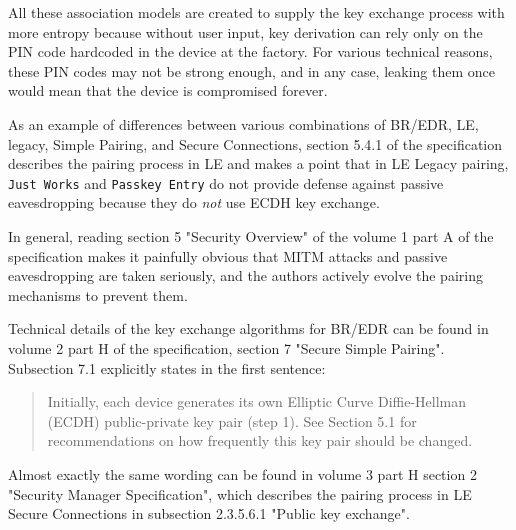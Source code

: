 All these association models are created to supply the key exchange process with more entropy because without user input, key derivation can rely only on the PIN code hardcoded in the device at the factory.
For various technical reasons, these PIN codes may not be strong enough, and in any case, leaking them once would mean that the device is compromised forever.

As an example of differences between various combinations of BR/EDR, LE, legacy, Simple Pairing, and Secure Connections, section 5.4.1 of the specification describes the pairing process in LE and makes a point that in LE Legacy pairing, \texttt{Just Works} and \texttt{Passkey Entry} do not provide defense against passive eavesdropping because they do \textit{not} use ECDH key exchange.

In general, reading section 5 "Security Overview" of the volume 1 part A of the specification makes it painfully obvious that MITM attacks and passive eavesdropping are taken seriously, and the authors actively evolve the pairing mechanisms to prevent them.

Technical details of the key exchange algorithms for BR/EDR can be found in volume 2 part H of the specification, section 7 "Secure Simple Pairing".
Subsection 7.1 explicitly states in the first sentence:

\begin{quote}
    Initially, each device generates its own Elliptic Curve Diffie-Hellman (ECDH) public-private key pair (step 1).
    See Section 5.1 for recommendations on how frequently this key pair should be changed.
\end{quote}

Almost exactly the same wording can be found in volume 3 part H section 2 "Security Manager Specification", which describes the pairing process in LE Secure Connections in subsection 2.3.5.6.1 "Public key exchange".